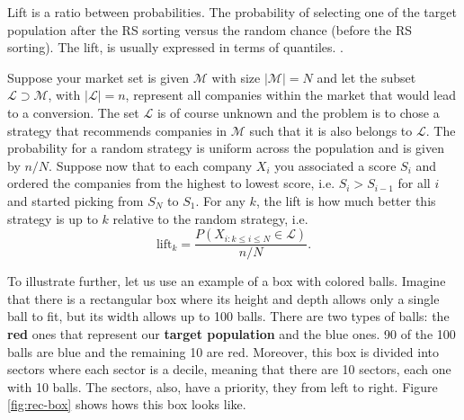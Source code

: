 Lift is a ratio between probabilities. The probability of selecting one of the target population after the RS sorting versus the random  chance (before the RS sorting). The lift, is usually expressed in terms of quantiles. \cite{LiftAnalysisADataScientistsSecretWeapon}.

Suppose your market set is given $\mathcal M$ with size $|\mathcal M |\!=\!N$ and let the subset $\mathcal L \supset \mathcal M $, with $|\mathcal L|\!=\!n$, represent all companies within the market that would lead to a conversion. The set $\mathcal L$ is of course unknown and the problem is to chose a strategy that recommends companies in $\mathcal M$ such that it is also belongs to $\mathcal L$. The probability for a random strategy is uniform across the population and is given by $n/N$. Suppose now that to each company $X_i$ you associated a score $S_i$ and ordered the companies from the highest to lowest score, i.e. $S_i>S_{i-1}$ for all $i$ and started picking from $S_N$ to $S_1$. For any $k$, the lift is how much better this strategy is up to $k$ relative to the random strategy, i.e.
\begin{equation}
    \mathrm{lift}_k = \frac{P(X_{i:k\leq i\leq N}\in \mathcal L)}{n/N}.
\end{equation}


To illustrate further, let us use an example of a box with colored balls. Imagine that there is a rectangular box where its height and depth allows only a single ball to fit, but its width allows up to 100 balls. There are two types of balls: the \textbf{red} ones that represent our \textbf{target population} and the blue ones. 90 of the 100 balls are blue and the remaining 10 are red. Moreover, this box is divided into sectors where each sector is a decile, meaning that there are 10 sectors, each one with 10 balls. The sectors, also, have a priority, they from left to right. Figure \ref{fig:rec-box} shows hows this box looks like.

